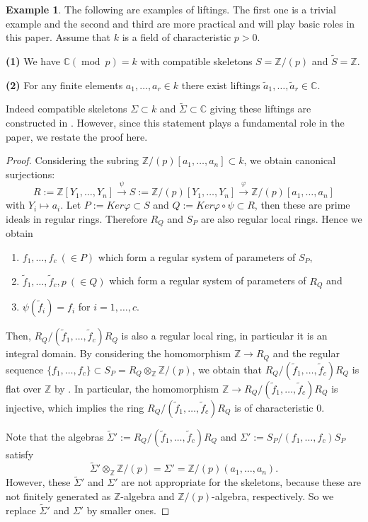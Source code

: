 \documentclass[a4paper]{amsart}
\def\CC{{\mathbb{C}}}
\def\ZZ{{\mathbb{Z}}}
\newcommand{\tf}{{\tilde f}}
\newcommand{\ta}{{\widetilde{a}}}
\newcommand{\ws}{{\widetilde{S}}}
\newcommand{\wsig}{{\widetilde{\Sigma}}}
\newcommand{\zp}{{\ZZ/(p)}}
\renewcommand{\mod}{{\operatorname{mod}\ }}
\theoremstyle{definition}
\newtheorem{ex}[thm]{Example}
\begin{document}
\begin{ex}\label{example-liftings}
    The following are examples of  liftings.
    The first one is a trivial example and the second and third are more practical and will play basic roles
    in this paper.
    Assume that $k$ is a field of characteristic $p>0$.
    
\noindent
{\bf(1)} 
     We have $\CC(\mod p)= k$ with compatible skeletons $S=\zp$ and $\ws=\ZZ$.




\noindent    
{\bf(2)} 
      For any  finite elements $a_1,\ldots,a_r\in k$
      there exist  liftings $\ta_1,\ldots,\ta_r\in \CC$.
      
     
      Indeed compatible skeletons $\Sigma\subset k$ and $\widetilde\Sigma\subset \CC$ 
      giving these liftings are constructed  in \cite[Proposition 2.3]{inv}.
However, since this statement plays a fundamental role in the paper, we restate the proof here.
\begin{proof}
    Considering the subring $\zp[a_1,\ldots, a_n]\subset k$,
    we obtain canonical surjections:
    $$R:=\ZZ[Y_1,\ldots,Y_n]\stackrel{\psi}\longrightarrow S:=\zp[Y_1,\ldots,Y_n]
    \stackrel{\varphi}\longrightarrow \zp[a_1,\ldots,a_n]$$
    with $Y_i \mapsto a_i$.
    Let $P:=Ker \varphi \subset S$ and $Q:=Ker \varphi\circ\psi \subset R$,
    then these are prime ideals in  regular rings.
    Therefore $R_Q$ and $S_P$ are also regular local rings.
    Hence we obtain
    \begin{enumerate}
       \item $f_1,\ldots,f_c\ (\in P)$ which form a regular system of parameters of $S_P$,
       \item  $\tf_1,\ldots, \tf_c, p \  (\in Q)$ which form a regular system of parameters of $R_Q$ and
       \item  $\psi(\tf_i)=f_i $ for $i=1,\ldots, c$.
    \end{enumerate}
    Then, $R_Q/(\tf_1,\ldots,\tf_c)R_Q$ is also a regular local ring, in particular it is an
    integral domain.
    By considering the homomorphism $\ZZ\to R_Q $ and the regular sequence 
    $\{f_1,\ldots,f_c \}\subset S_P= R_Q\otimes_\ZZ\zp$,
    we obtain that $R_Q/(\tf_1,\ldots,\tf_c)R_Q$ is flat over $\ZZ$
    by \cite[Corollary, p.177]{mats}.
    In particular, the homomorphism $\ZZ \to R_Q/(\tf_1,\ldots,\tf_c)R_Q$ is injective,
    which implies the ring $R_Q/(\tf_1,\ldots,\tf_c)R_Q$ is of characteristic $0$.
 
    Note that the algebras $\wsig':=R_Q/(\tf_1,\ldots,\tf_c)R_Q$ and $\Sigma':=S_P/(f_1,\ldots,f_c)S_P$
    satisfy $$\wsig'\otimes_\ZZ\zp=\Sigma'=\zp(a_1,\ldots, a_n).$$ 
  However,  these $\wsig'$ and $\Sigma'$ are not appropriate for the skeletons,
  because these are not finitely generated as $\ZZ$-algebra and $\zp$-algebra, respectively.
  So we replace $\wsig'$ and $\Sigma'$ by smaller ones.
     

\end{proof}
\end{ex}
\end{document}
